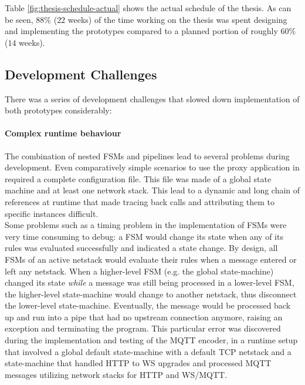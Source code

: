 Table \ref{fig:thesis-schedule-actual} shows the actual schedule of the thesis. As can be seen, $88\%$ ($22$ weeks) of the time working on the thesis was spent designing and implementing the prototypes compared to a planned portion of roughly $60\%$ ($14$ weeks).

\subsection{Development Challenges}
\label{sec:pm-challenges}
There was a series of development challenges that slowed down implementation of both prototypes considerably:
\paragraph{Complex runtime behaviour} The combination of nested \acp{FSM} and pipelines lead to several problems during development. Even comparatively simple scenarios to use the proxy application in required a complete configuration file. This file was made of a global state machine and at least one network stack. This lead to a dynamic and long chain of references at runtime that made tracing back calls and attributing them to specific instances difficult.\\
Some problems such as a timing problem in the implementation of \acp{FSM} were very time consuming to debug: a \ac{FSM} would change its state when any of its rules was evaluated successfully and indicated a state change. By design, all \acp{FSM} of an active netstack would evaluate their rules when a message entered or left any netstack. When a higher-level \ac{FSM} (e.g. the global state-machine) changed its state \emph{while} a message was still being processed in a lower-level \ac{FSM}, the higher-level state-machine would change to another netstack, thus disconnect the lower-level state-machine. Eventually, the message would be processed back up and run into a pipe that had no upstream connection anymore, raising an exception and terminating the program. This particular error was discovered during the implementation and testing of the \ac{MQTT} encoder, in a runtime setup that involved a global default state-machine with a default \ac{TCP} netstack and a state-machine that handled \ac{HTTP} to \ac{WS} upgrades and processed \ac{MQTT} messages utilizing network stacks for \ac{HTTP} and \ac{WS}/\ac{MQTT}.\\

